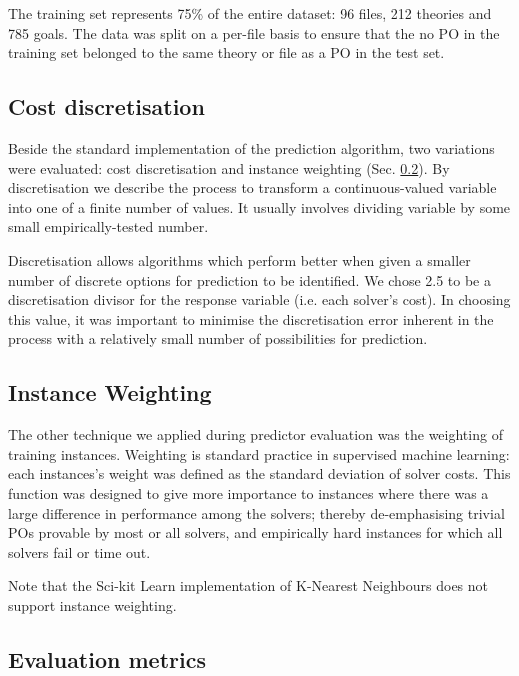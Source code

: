 The training set represents 75\% of the entire dataset: 96 files,   212 theories and 785 goals. 
The data was split on a per-file basis to ensure that the no PO in the training set belonged to the same theory or file as a PO in the test set. 


\subsection{Cost discretisation}

Beside the standard implementation of the prediction algorithm, two variations were evaluated: cost discretisation and instance weighting (Sec. \ref{sub:weighting}).
By discretisation we describe the process to transform a continuous-valued variable into one of a finite number of values. 
It usually involves dividing variable by some small empirically-tested number. 

Discretisation allows algorithms which perform better when given a smaller number of discrete options for prediction to be identified. 
We chose 2.5 to be a discretisation divisor for the response variable (i.e. each solver's cost).
In choosing this value, it was important to minimise the discretisation error inherent in the process with a relatively small number of possibilities for prediction.

\subsection{Instance Weighting}

\label{sub:weighting}

The other technique we applied during predictor evaluation was the weighting of training instances.
Weighting is standard practice in supervised machine learning: each instances's weight was defined as the standard deviation of solver costs. 
This function was designed to give more importance to instances where there was a large difference in performance among the solvers; thereby de-emphasising trivial POs provable by most or all solvers, and empirically hard instances for which all solvers fail or time out.  

Note that the Sci-kit Learn implementation of K-Nearest Neighbours does not support instance weighting.

\subsection{Evaluation metrics}


